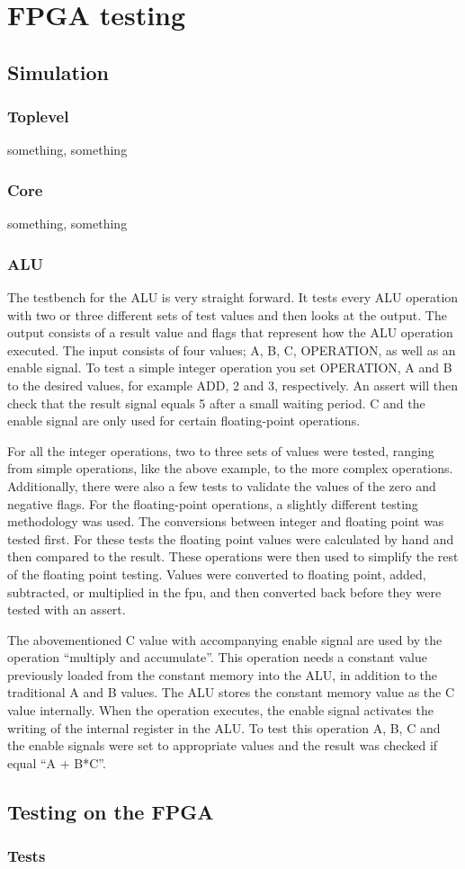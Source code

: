 \section{FPGA testing}
\subsection{Simulation}
\subsubsection{Toplevel}
something, something

\subsubsection{Core}
something, something

\subsubsection{ALU}
The testbench for the ALU is very straight forward. It tests every ALU operation
with two or three different sets of test values and then looks at the output.
The output consists of a result value and flags that represent how the ALU
operation executed. The input consists of four values; A, B, C, OPERATION, as
well as an enable signal. To test a simple integer operation you set OPERATION,
A and B to the desired values, for example ADD, 2 and 3, respectively. An assert
will then check that the result signal equals 5 after a small waiting period. C
and the enable signal are only used for certain floating-point operations.

For all the integer operations, two to three sets of values were tested, ranging
from simple operations, like the above example, to the more complex operations.
Additionally, there were also a few tests to validate the values of the zero and
negative  flags. For the floating-point
operations, a slightly different testing methodology was used. The conversions
between integer and floating point was tested first. For these tests the
floating point values were calculated by hand and then compared to the result.
These operations were then used to simplify the rest of the floating point
testing. Values were converted to floating point, added, subtracted, or
multiplied in the fpu, and then converted back before they were tested with an
assert.

The abovementioned C value with accompanying enable signal are used by the
operation ``multiply and accumulate''. This operation needs a constant value
previously loaded from the constant memory into the ALU, in addition to the
traditional A and B values. The ALU stores the constant memory value as the C
value internally. When the operation executes, the enable signal activates the
writing of the internal register in the ALU. To test this operation A, B, C and
the enable signals were set to appropriate values and the result was checked if
equal ``A + B*C''.

\subsection{Testing on the FPGA}\label{section:fpga-testing}

\subsubsection{Tests}

